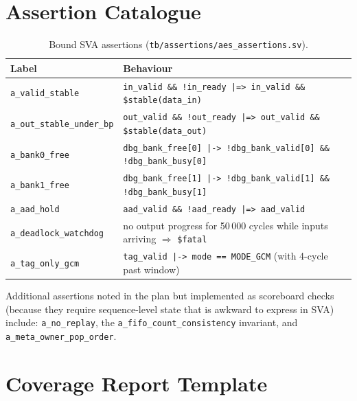 \documentclass[conference,10pt,a4paper]{IEEEtran}
\begin{document}
\section{Assertion Catalogue}
\label{app:sva}

\begin{table}[h]
\caption{Bound SVA assertions (\texttt{tb/assertions/aes\_assertions.sv}).}
\centering
\small
\begin{tabular}{p{} p{}}
\toprule
\textbf{Label} & \textbf{Behaviour} \\
\midrule
\texttt{a\_valid\_stable} &
\texttt{in\_valid \&\& !in\_ready |=> in\_valid \&\& \$stable(data\_in)} \\
\texttt{a\_out\_stable\_under\_bp} &
\texttt{out\_valid \&\& !out\_ready |=> out\_valid \&\& \$stable(data\_out)} \\
\texttt{a\_bank0\_free} &
\texttt{dbg\_bank\_free[0] |-> !dbg\_bank\_valid[0] \&\& !dbg\_bank\_busy[0]} \\
\texttt{a\_bank1\_free} &
\texttt{dbg\_bank\_free[1] |-> !dbg\_bank\_valid[1] \&\& !dbg\_bank\_busy[1]} \\
\texttt{a\_aad\_hold} &
\texttt{aad\_valid \&\& !aad\_ready |=> aad\_valid} \\
\texttt{a\_deadlock\_watchdog} &
no output progress for 50\,000 cycles while inputs arriving $\Rightarrow$
\texttt{\$fatal} \\
\texttt{a\_tag\_only\_gcm} &
\texttt{tag\_valid |-> mode == MODE\_GCM} (with 4-cycle past window) \\
\bottomrule
\end{tabular}
\end{table}

Additional assertions noted in the plan but implemented as scoreboard
checks (because they require sequence-level state that is awkward to
express in SVA) include: \texttt{a\_no\_replay}, the
\texttt{a\_fifo\_count\_consistency} invariant, and
\texttt{a\_meta\_owner\_pop\_order}.

\section{Coverage Report Template}
\label{app:cov}
\end{document}
